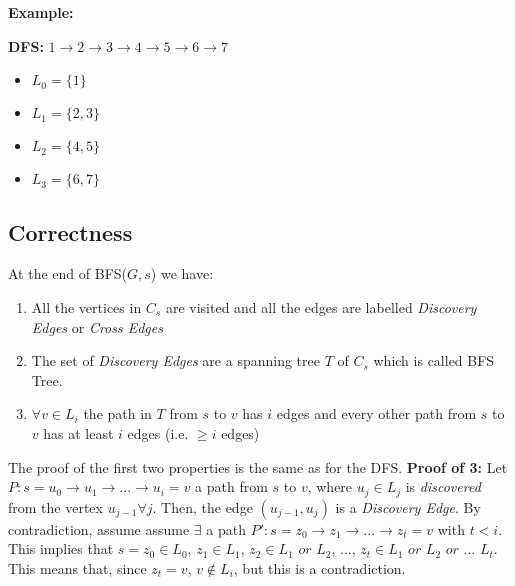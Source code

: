 \textbf{Example:}\newline\newline
{}\newline\newline
\textbf{DFS:} $1 \rightarrow 2 \rightarrow 3 \rightarrow 4 \rightarrow 5 \rightarrow 6 \rightarrow 7$
\begin{itemize}
    \item $L_{0} = \{1\}$
    \item $L_{1} = \{2, 3\}$
    \item $L_{2} = \{4, 5\}$
    \item $L_{3} = \{6, 7\}$
\end{itemize}

\subsection{Correctness}
At the end of BFS($G, s$) we have:
\begin{enumerate}
    \item All the vertices in $C_{s}$ are visited and all the edges are labelled \textit{Discovery Edges} or \textit{Cross Edges}

    \item The set of \textit{Discovery Edges} are a spanning tree $T$ of $C_{s}$ which is called BFS Tree.

    \item $\forall v \in L_{i}$ the path in $T$ from $s$ to $v$ has $i$ edges and every other path from $s$ to $v$ has at least $i$ edges (i.e. $\geq i$ edges)
\end{enumerate}
The proof of the first two properties is the same as for the DFS.\newline\newline
\textbf{Proof of 3:}\newline
Let $P: s = u_{0} \rightarrow u_{1} \rightarrow ... \rightarrow u_{i} = v$ a path from $s$ to $v$, where $u_{j} \in L_{j}$ is \textit{discovered} from the vertex $u_{j - 1} \forall j$. Then, the edge $(u_{j - 1}, u_{j})$ is a \textit{Discovery Edge}. By contradiction, assume assume $\exists$ a path $P': s = z_{0} \rightarrow z_{1} \rightarrow ... \rightarrow z_{t} = v$ with $t < i$. This implies that $ s = z_{0} \in L_{0}$, $z_{1} \in L_{1}$, $z_{2} \in L_{1} \,\, or \,\, L_{2}$, ..., $z_{t} \in L_{1} \,\, or \,\, L_{2} \,\, or \,\,...\,\,L_{t}$. This means that, since $z_{t} = v$, $v \notin L_{i}$, but this is a contradiction.

